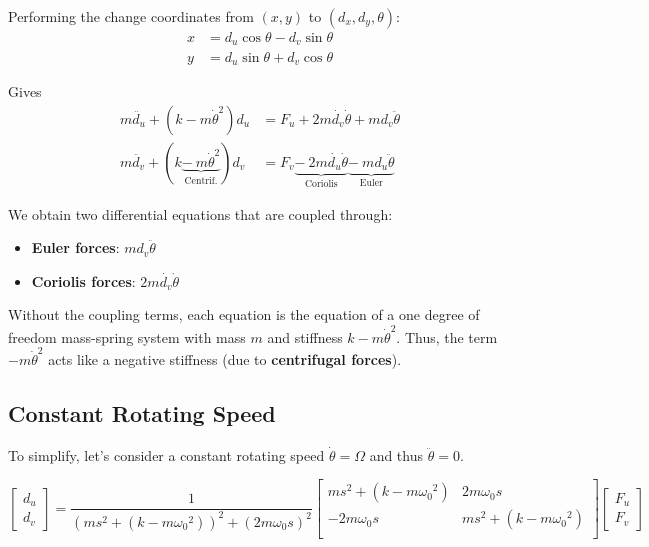 \documentclass{ISMA_USD2020}
\begin{document}
Performing the change coordinates from \((x, y)\) to \((d_x, d_y, \theta)\):
\begin{subequations}
  \begin{align}
    x & = d_u \cos{\theta} - d_v \sin{\theta}\\
    y & = d_u \sin{\theta} + d_v \cos{\theta}
  \end{align}
\end{subequations}

Gives
\begin{subequations}
\label{eq:oem_coupled}
  \begin{align}
    m \ddot{d_u} + (k - m\dot{\theta}^2) d_u &= F_u + 2 m\dot{d_v}\dot{\theta} + m d_v\ddot{\theta} \label{eq:du_coupled} \\
    m \ddot{d_v} + (k \underbrace{-\ m\dot{\theta}^2}_{\text{Centrif.}}) d_v &= F_v \underbrace{-\ 2 m\dot{d_u}\dot{\theta}}_{\text{Coriolis}} \underbrace{-\ m d_u\ddot{\theta}}_{\text{Euler}} \label{eq:dv_coupled}
  \end{align}
\end{subequations}

We obtain two differential equations that are coupled through:
\begin{itemize}
\item \textbf{Euler forces}: \(m d_v \ddot{\theta}\)
\item \textbf{Coriolis forces}: \(2 m \dot{d_v} \dot{\theta}\)
\end{itemize}

Without the coupling terms, each equation is the equation of a one degree of freedom mass-spring system with mass \(m\) and stiffness \(k- m\dot{\theta}^2\).
Thus, the term \(- m\dot{\theta}^2\) acts like a negative stiffness (due to \textbf{centrifugal forces}).

\subsection{Constant Rotating Speed}
\label{sec:org47aaeee}
To simplify, let's consider a constant rotating speed \(\dot{\theta} = \Omega\) and thus \(\ddot{\theta} = 0\).

\begin{equation}
\label{eq:coupledplant}
\begin{bmatrix} d_u \\ d_v \end{bmatrix} =
\frac{1}{(m s^2 + (k - m{\omega_0}^2))^2 + (2 m {\omega_0} s)^2}
\begin{bmatrix}
  ms^2 + (k-m{\omega_0}^2) & 2 m \omega_0 s \\
  -2 m \omega_0 s          & ms^2 + (k-m{\omega_0}^2) \\
\end{bmatrix}
\begin{bmatrix} F_u \\ F_v \end{bmatrix}
\end{equation}
\end{document}
